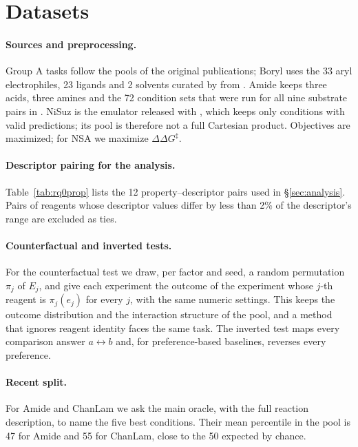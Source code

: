\section{Datasets}
\label{app:data}



\paragraph{Sources and preprocessing.}
Group A tasks follow the pools of the original publications; Boryl uses the 33 aryl electrophiles, 23 ligands and 2 solvents curated by \citet{schmid2025general} from \citet{stevens2022borylation}. Amide keeps three acids, three amines and the 72 condition sets that were run for all nine substrate pairs in \citet{zhang2025amide}. NiSuz is the emulator released with \citet{schlama2025swarm}, which keeps only conditions with valid predictions; its pool is therefore not a full Cartesian product. Objectives are maximized; for NSA we maximize $\Delta\Delta G^{\ddagger}$.

\paragraph{Descriptor pairing for the analysis.}
Table~\ref{tab:rq0prop} lists the 12 property--descriptor pairs used in \S\ref{sec:analysis}. Pairs of reagents whose descriptor values differ by less than 2\% of the descriptor's range are excluded as ties.



\paragraph{Counterfactual and inverted tests.}
For the counterfactual test we draw, per factor and seed, a random permutation $\pi_j$ of $E_j$, and give each experiment the outcome of the experiment whose $j$-th reagent is $\pi_j(e_j)$ for every $j$, with the same numeric settings. This keeps the outcome distribution and the interaction structure of the pool, and a method that ignores reagent identity faces the same task. The inverted test maps every comparison answer $a\leftrightarrow b$ and, for preference-based baselines, reverses every preference.

\paragraph{Recent split.}
For Amide and ChanLam we ask the main oracle, with the full reaction description, to name the five best conditions. Their mean percentile in the pool is 47 for Amide and 55 for ChanLam, close to the 50 expected by chance.

